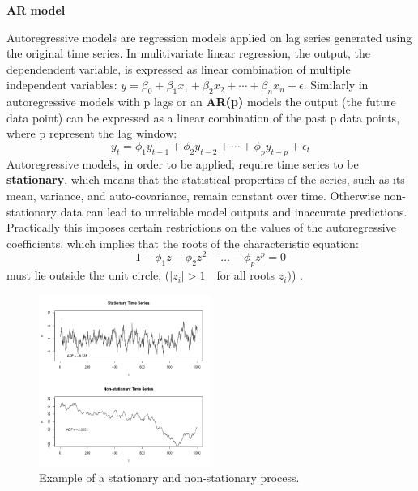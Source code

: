 \textbf{AR model}

Autoregressive models are regression models applied on lag series generated using the original time series. In mulitivariate linear regression, the output, the dependendent variable, is expressed as linear combination of multiple independent variables: \( y = \beta_0 + \beta_1 x_1 + \beta_2 x_2 + \cdots + \beta_n x_n + \epsilon \).
Similarly in autoregressive models with p lags or an \textbf{AR(p)} models the output (the future data point) can be expressed as a linear combination of the past p data points, where p represent the lag window: 
\begin{equation}
 y_t = \phi_1 y_{t-1} + \phi_2 y_{t-2} + \cdots + \phi_p y_{t-p} + \epsilon_t 
\end{equation}
Autoregressive models, in order to be applied, require time series to be \textbf{stationary}, which means that the statistical properties of the series, such as its mean, variance, and auto-covariance, remain constant over time. Otherwise non-stationary data can lead to unreliable model outputs and inaccurate predictions. Practically this imposes certain restrictions on the values of the autoregressive coefficients, which implies that the roots of the characteristic equation:
\begin{equation}
 1 - \phi_1 z - \phi_2 z^2 - \ldots - \phi_p z^p = 0
\end{equation}
must lie outside the unit circle, (\(|z_i| > 1 \quad\)for all roots \(z_i)\)) \cite[Section 3.2]{box1970time}.

\begin{figure}[H]
    \centering
    \includegraphics[width=0.50\textwidth]{Machine_learning_thesis/Images/Stationarycomparison.png}
    \caption{Example of a stationary and non-stationary process.} 
    \label{fig:Stationarycomparison}
\end{figure}

